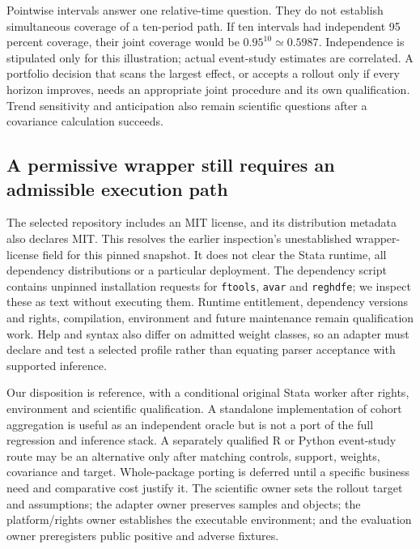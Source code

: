 Pointwise intervals answer one relative-time question. They do not establish
simultaneous coverage of a ten-period path. If ten intervals had independent
95 percent coverage, their joint coverage would be $0.95^{10}\simeq0.5987$.
Independence is stipulated only for this illustration; actual event-study
estimates are correlated. A portfolio decision that scans the largest effect,
or accepts a rollout only if every horizon improves, needs an appropriate
joint procedure and its own qualification. Trend sensitivity and anticipation
also remain scientific questions after a covariance calculation succeeds.
\citep{exec24_eventstudy_original,exec24_eventstudy_contract}

\subsection{A permissive wrapper still requires an admissible execution path}
The selected repository includes an MIT license, and its distribution metadata
also declares MIT. This resolves the earlier inspection's unestablished
wrapper-license field for this pinned snapshot. It does not clear the Stata
runtime, all dependency distributions or a particular deployment. The dependency
script contains unpinned installation requests for \texttt{ftools}, \texttt{avar}
and \texttt{reghdfe}; we inspect these as text without executing them. Runtime
entitlement, dependency versions and rights, compilation, environment and future
maintenance remain qualification work. Help and syntax also differ on admitted
weight classes, so an adapter must declare and test a selected profile rather
than equating parser acceptance with supported inference.
\citep{exec24_eventstudy_sources}

Our disposition is reference, with a conditional original Stata worker after
rights, environment and scientific qualification. A standalone implementation
of cohort aggregation is useful as an independent oracle but is not a port of
the full regression and inference stack. A separately qualified R or Python
event-study route may be an alternative only after matching controls, support,
weights, covariance and target. Whole-package porting is deferred until a
specific business need and comparative cost justify it. The scientific owner
sets the rollout target and assumptions; the adapter owner preserves samples
and objects; the platform/rights owner establishes the executable environment;
and the evaluation owner preregisters public positive and adverse fixtures.
\citep{exec24_eventstudy_contract}

